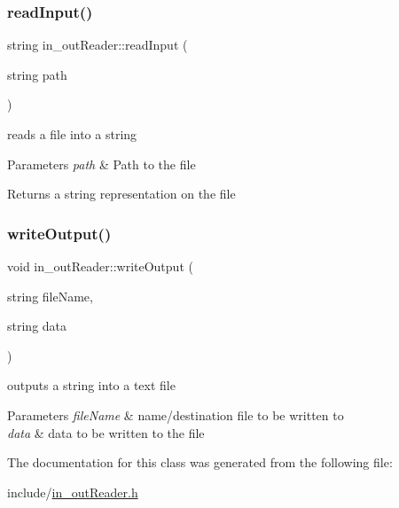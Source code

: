 \subsubsection{\texorpdfstring{read\+Input()}{readInput()}}
{\footnotesize\ttfamily string in\+\_\+out\+Reader\+::read\+Input (\begin{DoxyParamCaption}\item[{string}]{path }\end{DoxyParamCaption})}



reads a file into a string 


\begin{DoxyParams}{Parameters}
{\em path} & Path to the file \\
\hline
\end{DoxyParams}
\begin{DoxyReturn}{Returns}
a string representation on the file 
\end{DoxyReturn}
\mbox{\label{classin__out_reader_aaae376a66225af54a288cee7b5a6331e}} 
\subsubsection{\texorpdfstring{write\+Output()}{writeOutput()}}
{\footnotesize\ttfamily void in\+\_\+out\+Reader\+::write\+Output (\begin{DoxyParamCaption}\item[{string}]{file\+Name,  }\item[{string}]{data }\end{DoxyParamCaption})}



outputs a string into a text file 


\begin{DoxyParams}{Parameters}
{\em file\+Name} & name/destination file to be written to \\
\hline
{\em data} & data to be written to the file \\
\hline
\end{DoxyParams}


The documentation for this class was generated from the following file\+:\begin{DoxyCompactItemize}
\item 
include/\hyperlink{in__out_reader_8h}{in\+\_\+out\+Reader.\+h}\end{DoxyCompactItemize}
